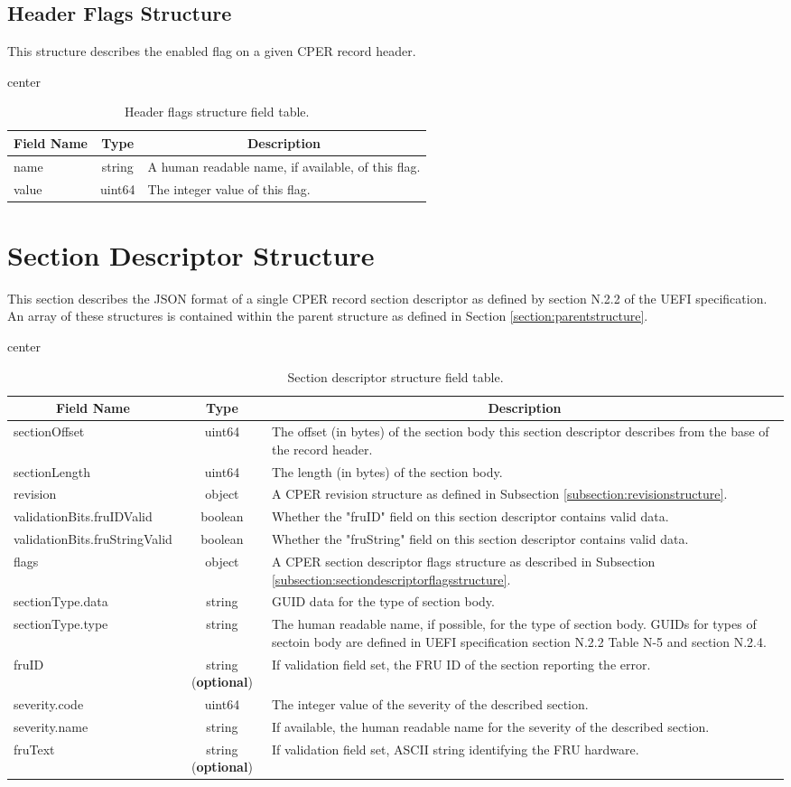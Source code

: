 \documentclass{report}
\newcommand*{\thead}[1]{\multicolumn{1}{|c|}{\bfseries #1}}
\newcommand*{\jsontable}[1]{
    \begin{table}[!ht]
    \label{#1}
    \centering
    \begin{adjustbox}{center}
    \begin{tabular}{|l|c|p{8cm}|}
    \hline
    \thead{Field Name} & \thead{Type} & \thead{Description} \\
    \hline
}
\newcommand*{\jsontableend}[1]{
    \hline
    \end{tabular}
    \end{adjustbox}
    \caption{#1}
    \label{table:#1}
    \end{table}
    \FloatBarrier
}
\begin{document}
\subsection{Header Flags Structure}
\label{subsection:headerflagsstructure}
This structure describes the enabled flag on a given CPER record header.
\jsontable{table:headerflagsstructure}
name & string & A human readable name, if available, of this flag.\\
\hline
value & uint64 & The integer value of this flag.\\
\jsontableend{Header flags structure field table.}

\section{Section Descriptor Structure}
\label{section:sectiondescriptorstructure}
This section describes the JSON format of a single CPER record section descriptor as defined by section N.2.2 of the UEFI specification. An array of these structures is contained within the parent structure as defined in Section \ref{section:parentstructure}.

\jsontable{table:sectiondescriptorstructure}
sectionOffset & uint64 & The offset (in bytes) of the section body this section descriptor describes from the base of the record header.\\
\hline
sectionLength & uint64 & The length (in bytes) of the section body.\\
\hline
revision & object & A CPER revision structure as defined in Subsection \ref{subsection:revisionstructure}.\\
\hline
validationBits.fruIDValid & boolean & Whether the "fruID" field on this section descriptor contains valid data.\\
validationBits.fruStringValid & boolean & Whether the "fruString" field on this section descriptor contains valid data.\\
\hline
flags & object & A CPER section descriptor flags structure as described in Subsection \ref{subsection:sectiondescriptorflagsstructure}.\\
\hline
sectionType.data & string & GUID data for the type of section body.\\
sectionType.type & string & The human readable name, if possible, for the type of section body. GUIDs for types of sectoin body are defined in UEFI specification section N.2.2 Table N-5 and section N.2.4.\\
\hline
fruID & string (\textbf{optional}) & If validation field set, the FRU ID of the section reporting the error.\\
\hline
severity.code & uint64 & The integer value of the severity of the described section.\\
severity.name & string & If available, the human readable name for the severity of the described section.\\
\hline
fruText & string (\textbf{optional}) & If validation field set, ASCII string identifying the FRU hardware.\\
\jsontableend{Section descriptor structure field table.}
\end{document}
